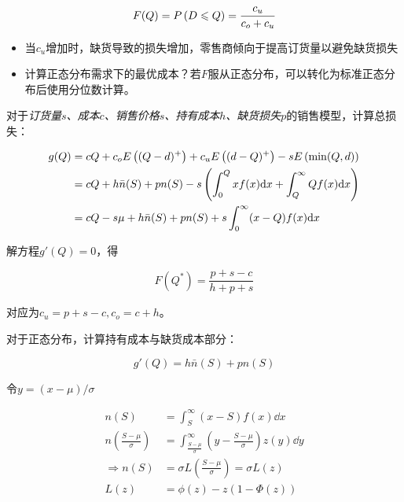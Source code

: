 \documentclass{../notes}
\begin{document}
    \begin{equation}
        F(Q) = P\left(D\leqslant Q\right) = \frac{c_u}{c_o+c_u}
    \end{equation}

    \begin{itemize}
        \item 当$c_u$增加时，缺货导致的损失增加，零售商倾向于提高订货量以避免缺货损失
        \item 计算正态分布需求下的最优成本？若$F$服从正态分布，可以转化为标准正态分布后使用分位数计算。
    \end{itemize}

    \separate[0.5pt]

    对于\textit{订货量$s$、成本$c$、销售价格$s$、持有成本$h$、缺货损失$p$}的销售模型，计算总损失：

    \begin{equation}
        \begin{aligned}
            g(Q) &= cQ+c_oE\left((Q-d)^+\right) + c_uE\left((d-Q)^+\right) - sE\left(\min(Q, d)\right) \\
            &= cQ + h\bar n(S) + pn(S) - s\left(\int_0^Q xf(x)\mathrm d x + \int_Q^\infty Qf(x)\mathrm d x\right) \\
            &= cQ - s\mu + h\bar n(S) + pn(S) + s\int_0^\infty (x-Q)f(x)\mathrm d x
        \end{aligned}
    \end{equation}

    解方程$g'(Q) = 0$，得

    \begin{equation}
        F(Q^*) = \frac{p + s - c}{h + p + s}
    \end{equation}

    对应为$c_u = p + s - c, c_o = c + h$。

    对于正态分布，计算持有成本与缺货成本部分：

    \begin{equation}
        g'(Q) = h\bar n(S) + pn(S)
    \end{equation}

    令$y=(x-\mu) / \sigma$

    \begin{equation*}
        \begin{aligned}
            n(S) &= \int_S^\infty (x-S)f(x)\dd x \\
            n\left(\frac{S-\mu}{\sigma}\right) &= \int_{\frac{S-\mu}{\sigma}}^\infty \left(y - \frac{S-\mu}{\sigma}\right)z(y)\dd y \\
            \Rightarrow n(S)&= \sigma L\left(\frac{S-\mu}{\sigma}\right) = \sigma L(z) \\
            L(z) &= \phi(z) - z(1 - \Phi(z))
        \end{aligned}
    \end{equation*}
\end{document}
